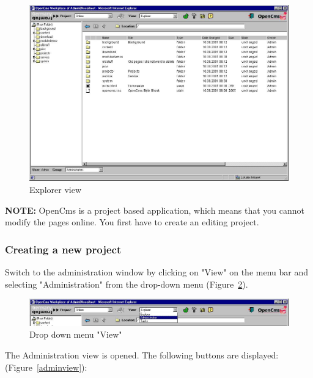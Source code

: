 \begin{figure}[hbt]
\begin{center}
\includegraphics[width=\sgw]
                   {pics/usermanual/explorer}
\caption[Explorer view]
           {Explorer view}
\label{explorer}
\end{center}
\end{figure}

\textbf{NOTE:} OpenCms is a project based application, which means
that you cannot modify the pages online. You first have to create
an editing project.

\subsubsection{Creating a new project}

Switch to the administration window by clicking on "View" on the
menu bar and selecting "Administration" from the drop-down menu
(Figure~\ref{view}).

\begin{figure}[h]
\begin{center}
\includegraphics[width=\sgw]
                   {pics/usermanual/view}
\caption[Drop down menu "View"]
           {Drop down menu "View"}
\label{view}
\end{center}
\end{figure}

The Administration view is opened. The following buttons are
displayed: (Figure~\ref{adminview}):

